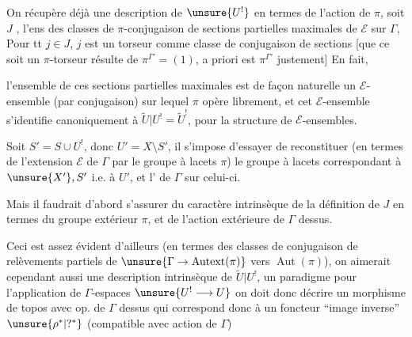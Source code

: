 On récupère déjà une description de \(\unsure{U^!}\) en termes de
l'action de \(\pi\), soit \(J\) ,
l'ens des classes de \(\pi\)-conjugaison
de sections partielles  maximales de
\(\mathcal E\) sur \(\Gamma\),
Pour tt \(j\in J\), \(j\) est un \inserted{\(\pi\)-}torseur
comme
classe de \inserted{\(\pi\)-}conjugaison de sections
[que ce soit un \(\pi\)-torseur résulte de
\(\pi^{\Gamma'}=(1)\), a priori
est \(\pi^{\Gamma'}\) justement]
En fait,



l'ensemble de  ces  sections
partielles maximales est de façon naturelle un \(\mathcal E\)-ensemble
(par conjugaison)  sur lequel \(\pi\) opère librement, et cet
\(\mathcal E\)-ensemble s'identifie canoniquement à
\(\widetilde U|U^!=\widetilde U^!\), pour la structure de
\(\mathcal E\)-ensembles.

Soit \(S'=S\cup U^!\), donc \(U'=X\setminus S'\),
il s'impose d'essayer de reconstituer
(en termes de l'extension \(\mathcal E\) de \(\Gamma\) par le groupe à
lacets \(\pi\)) le groupe  à lacets correspondant
à \(\unsure{X'},S'\) i.e. à \(U'\), et l'
 de \(\Gamma\) sur celui-ci.

Mais il faudrait d'abord s'assurer du caractère intrinsèque de la
définition de \(J\) 
en termes du  
groupe extérieur \(\pi\), et de l'action
 extérieure de \(\Gamma\) dessus.



Ceci est assez évident d'ailleurs
(en termes  des classes de
\inserted{\(\pi\)-}conjugaison de relèvements partiels de
\(\unsure{\Gamma\to\operatorname{Autext}(\pi)}\) vers
\(\operatorname{Aut}(\pi)\)), on aimerait cependant aussi une
description intrinsèque de \(\widetilde U|U^!\),
 un paradigme pour l'application de
\(\Gamma\)-espaces \(\unsure{U^!\longrightarrow U}\)
on doit donc décrire un morphisme de topos avec op. de \(\Gamma\) dessus
qui correspond donc à un  foncteur
``image inverse'' \(\unsure{\rho^*|?^*}\)
(compatible avec action de \(\Gamma\))

